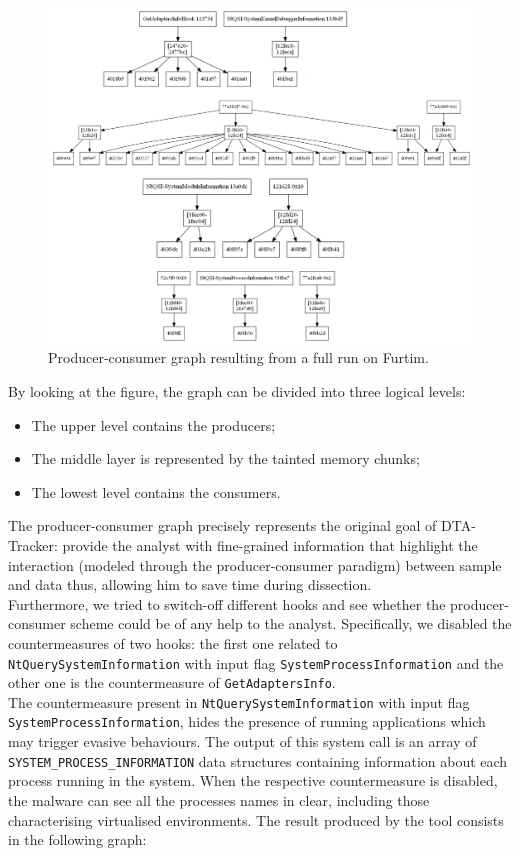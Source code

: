 \documentclass[LaM,binding=0.6cm]{sapthesis}
\begin{document}
\begin{figure}[h!]
\centering
\includegraphics[scale=.5]{images/eval1}
\caption{Producer-consumer graph resulting from a full run on Furtim.}
\label{fig:eval1}
\end{figure}

By looking at the figure, the graph can be divided into three logical levels:
\begin{itemize}
\item The upper level contains the producers;
\item The middle layer is represented by the tainted memory chunks;
\item The lowest level contains the consumers.
\end{itemize}
The producer-consumer graph precisely represents the original goal of DTA-Tracker: provide the analyst with fine-grained information that highlight the interaction (modeled through the producer-consumer paradigm) between sample and data thus, allowing him to save time during dissection.\\
Furthermore, we tried to switch-off different hooks and see whether the producer-consumer scheme could be of any help to the analyst. Specifically, we disabled the countermeasures of two hooks: the first one related to \texttt{NtQuerySystemInformation} with input flag \texttt{SystemProcessInformation} and the other one is the countermeasure of \texttt{GetAdaptersInfo}.\\

The countermeasure present in \texttt{NtQuerySystemInformation} with input flag \texttt{SystemProcessInformation}, hides the presence of running applications which may trigger evasive behaviours. The output of this system call is an array of \texttt{SYSTEM\_PROCESS\_INFORMATION} data structures containing information about each process running in the system. When the respective countermeasure is disabled, the malware can see all the processes names in clear, including those characterising virtualised environments. The result produced by the tool consists in the following graph:
\end{document}

